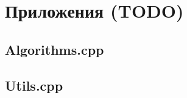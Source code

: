 \newpage

\section*{Приложения (TODO)}

\subsection*{Algorithms.cpp}


\subsection*{Utils.cpp}


\clearpage